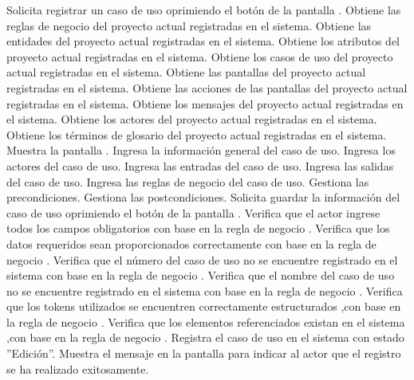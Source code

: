 	\begin{UCtrayectoria}
		\UCpaso[\UCactor] Solicita registrar un caso de uso oprimiendo el botón  de la pantalla .
		\UCpaso[\UCsist] Obtiene las reglas de negocio del proyecto actual registradas en el sistema.
		\UCpaso[\UCsist] Obtiene las entidades del proyecto actual registradas en el sistema.
		\UCpaso[\UCsist] Obtiene los atributos del proyecto actual registradas en el sistema.
		\UCpaso[\UCsist] Obtiene los casos de uso del proyecto actual registradas en el sistema.
		\UCpaso[\UCsist] Obtiene las pantallas del proyecto actual registradas en el sistema.
		\UCpaso[\UCsist] Obtiene las acciones de las pantallas del proyecto actual registradas en el sistema.
		\UCpaso[\UCsist] Obtiene los mensajes del proyecto actual registradas en el sistema.
		\UCpaso[\UCsist] Obtiene los actores del proyecto actual registradas en el sistema.
		\UCpaso[\UCsist] Obtiene los términos de glosario del proyecto actual registradas en el sistema.
		\UCpaso[\UCsist] Muestra la pantalla .
		\UCpaso[\UCactor] Ingresa la información general del caso de uso. \label{CU12.1-P12}
		\UCpaso[\UCactor] Ingresa los actores del caso de uso.  \label{CU12.1-P13}
		\UCpaso[\UCactor] Ingresa las entradas del caso de uso.   \label{CU12.1-P14}
		\UCpaso[\UCactor] Ingresa las salidas  del caso de uso.  \label{CU12.1-P15}
		\UCpaso[\UCactor] Ingresa las reglas de negocio del caso de uso.  \label{CU12.1-P16}
		\UCpaso[\UCactor] Gestiona las precondiciones. \label{CU12.1-P17}
		\UCpaso[\UCactor] Gestiona las postcondiciones. \label{CU12.1-P18}
		\UCpaso[\UCactor] Solicita guardar la información del caso de uso oprimiendo el botón  de la pantalla . \label{CU10.1-P5}  
		\UCpaso[\UCsist] Verifica que el actor ingrese todos los campos obligatorios con base en la regla de negocio . 
		\UCpaso[\UCsist] Verifica que los datos requeridos sean proporcionados correctamente con base en la regla de negocio .   
		\UCpaso[\UCsist] Verifica que el número del caso de uso no se encuentre registrado en el sistema con base en la regla de negocio . 
		\UCpaso[\UCsist] Verifica que el nombre del caso de uso no se encuentre registrado en el sistema con base en la regla de negocio . 
		\UCpaso[\UCsist] Verifica que los tokens utilizados se encuentren correctamente estructurados ,con base en la regla de negocio . 
		\UCpaso[\UCsist] Verifica que los elementos referenciados existan en el sistema ,con base en la regla de negocio . 
		\UCpaso[\UCsist] Registra el caso de uso en el sistema con estado ''Edición''.
		\UCpaso[\UCsist] Muestra el mensaje  en la pantalla  para indicar al actor que el registro se ha realizado exitosamente.
	\end{UCtrayectoria}		
